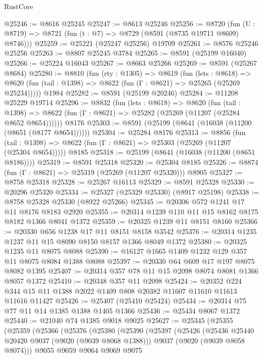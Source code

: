 \begin{lexlean}{RustCore}
\begin{coremodule}
@25246 := @8616 @25245
@25247 := @8613 @25246
@25256 := @8720
    (fun (U : @8719) => @8721 (fun (t : @7) => @8729 (@8591 (@8735 @19711 @8609) @8746)))
@25259 := @25221 (@25247 @25256) @19709
@25261 := @8576 @25246 @25256
@25263 := @8807 @25245 @3784
@25265 := @8591 (@25199 @16040)
@25266 := @25224 @16043
@25267 := @8663 @25266
@25269 := @8591 (@25267 @8684)
@25280 := @8810
    (fun (rty : @1305) =>
    @8619
      (fun (lets : @8618) =>
      @8620 (fun (tail : @1398) => @8622 (fun (Γ : @8621) => @25265 (@25269 @25234)))))
    @1984
@25282 := @8591 (@25199 @20246)
@25284 := @11208 @25229 @19714
@25296 := @8832
    (fun (lets : @8618) =>
    @8620
      (fun (tail : @1398) =>
      @8622 (fun (Γ : @8621) => @25282 (@25269 (@11207 (@25284 @8652 @8654))))))
    @8176
@25303 := @8591 (@25199 (@8641 (@16038 (@11200 (@8651 (@8177 @8654))))))
@25304 := @25284 @8176
@25313 := @8856
    (fun (tail : @1398) => @8622 (fun (Γ : @8621) => @25303 (@25269 (@11207 (@25304 @8654)))))
    @8185
@25318 := @25199 (@8641 (@16038 (@11200 (@8651 @8186))))
@25319 := @8591 @25318
@25320 := @25304 @8185
@25326 := @8874 (fun (Γ : @8621) => @25319 (@25269 (@11207 @25320))) @8905
@25327 := @8758 @25318
@25328 := @25267 @16113
@25329 := @8591 @25328
@25330 := @20296 @25320
@25334 := @25327 (@25329 @25330) (@8917 @25198)
@25338 := @8758 @25328 @25330 (@8922 @25266)
@25345 := @20306 @572 @1241 @17 @11 @8176 @8183 @2920
@25355 := @20314 @1239 @110 @11 @15 @8162 @8175 @8182 @1366 @8041 @1372
@25359 := @20325 @1239 @11 @8151 @8160
@25366 := @20330 @656 @1238 @17 @11 @8151 @8158 @3542
@25376 := @20314 @1235 @1237 @11 @15 @8090 @8150 @8157 @1366 @8049 @1372
@25380 := @20325 @1235 @11 @8075 @8088
@25390 := @16127 @1665 @1409 @1232 @129 @357 @11 @8075 @8084 @1388 @8088
@25397 := @20330 @64 @609 @17 @197 @8075 @8082 @1395
@25407 := @20314 @357 @78 @11 @15 @2098 @8074 @8081 @1366 @8057 @1372
@25410 := @20348 @357 @11 @2098
@25424 := @20352 @224 @344 @15 @11 @1388 @2022 @1409 @808 @20382 @11607 @11610 @11613 @11616 @11427
@25426 := @25407 (@25410 @25424)
@25434 := @20314 @75 @77 @11 @14 @1385 @1388 @1405 @1366
@25436 := @25434 @8067 @1372
@25440 := @21040 @74 @1385 @9018 @9025
@25627 := @25345
    (@25355
      (@25359
        (@25366
          (@25376
            (@25380
              (@25390
                (@25397
                  (@25426
                    (@25436 @25440 @20420 @9037 (@9020 (@9039 @8068 @1388)))
                    @9037
                    (@9020 (@9039 @8058 @8074)))
                  @9055
                  @9059
                  @9064
                  @9069
                  @9075

\end{coremodule}
\end{lexlean}
